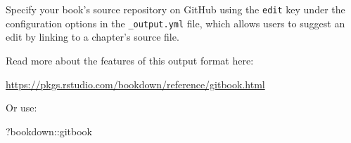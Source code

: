 \documentclass[
]{book}
\newenvironment{Shaded}{\begin{snugshade}}{\end{snugshade}}
\newcommand{\NormalTok}[1]{#1}
\newcommand{\SpecialCharTok}[1]{\textcolor[rgb]{0.00,0.00,0.00}{#1}}
\theoremstyle{definition}
\theoremstyle{definition}
\theoremstyle{definition}
\theoremstyle{definition}
\theoremstyle{remark}
\begin{document}
Specify your book's source repository on GitHub using the \texttt{edit} key under the configuration options in the \texttt{\_output.yml} file, which allows users to suggest an edit by linking to a chapter's source file.

Read more about the features of this output format here:

\url{https://pkgs.rstudio.com/bookdown/reference/gitbook.html}

Or use:

\begin{Shaded}
\begin{Highlighting}[]
\NormalTok{?bookdown}\SpecialCharTok{::}\NormalTok{gitbook}
\end{Highlighting}
\end{Shaded}


  
\end{document}
